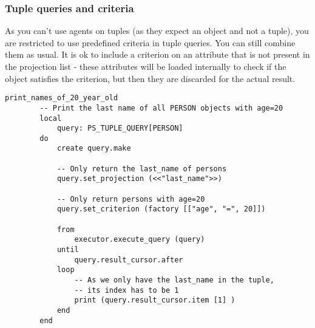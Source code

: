 \subsubsection{Tuple queries and criteria}
As you can't use agents on tuples (as they expect an object and not a tuple), you are restricted to use predefined criteria in tuple queries. You can still combine them as usual.
It is ok to include a criterion on an attribute that is not present in the projection list - these attributes will be loaded internally to check if the object satisfies the criterion, but then they are discarded for the actual result.

\begin{lstlisting}[language=OOSC2Eiffel, captionpos=b, caption={}, label={lst:tuple_projection_selection}]
	print_names_of_20_year_old
		-- Print the last name of all PERSON objects with age=20
		local
			query: PS_TUPLE_QUERY[PERSON]
		do
			create query.make

			-- Only return the last_name of persons
			query.set_projection (<<"last_name">>)

			-- Only return persons with age=20
			query.set_criterion (factory [["age", "=", 20]])

			from
				executor.execute_query (query)
			until
				query.result_cursor.after
			loop
				-- As we only have the last_name in the tuple,
				-- its index has to be 1
				print (query.result_cursor.item [1] )
			end			
		end
\end{lstlisting}
